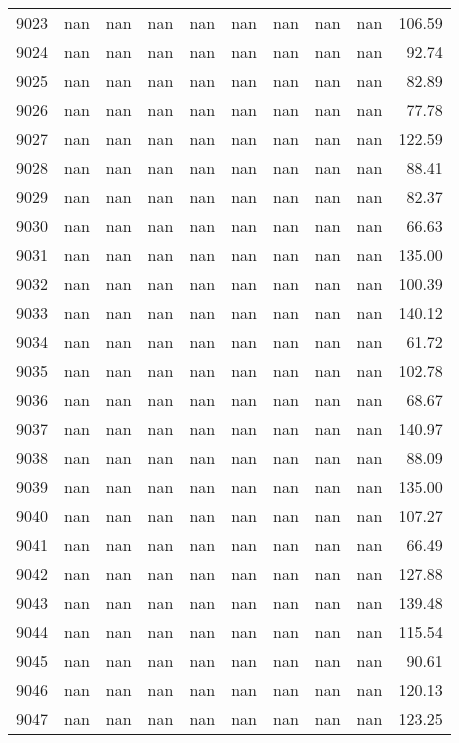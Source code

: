 \begin{tabular}{lrrrrrrrrr}
9023 & nan & nan & nan & nan & nan & nan & nan & nan & 106.59 \\
9024 & nan & nan & nan & nan & nan & nan & nan & nan & 92.74 \\
9025 & nan & nan & nan & nan & nan & nan & nan & nan & 82.89 \\
9026 & nan & nan & nan & nan & nan & nan & nan & nan & 77.78 \\
9027 & nan & nan & nan & nan & nan & nan & nan & nan & 122.59 \\
9028 & nan & nan & nan & nan & nan & nan & nan & nan & 88.41 \\
9029 & nan & nan & nan & nan & nan & nan & nan & nan & 82.37 \\
9030 & nan & nan & nan & nan & nan & nan & nan & nan & 66.63 \\
9031 & nan & nan & nan & nan & nan & nan & nan & nan & 135.00 \\
9032 & nan & nan & nan & nan & nan & nan & nan & nan & 100.39 \\
9033 & nan & nan & nan & nan & nan & nan & nan & nan & 140.12 \\
9034 & nan & nan & nan & nan & nan & nan & nan & nan & 61.72 \\
9035 & nan & nan & nan & nan & nan & nan & nan & nan & 102.78 \\
9036 & nan & nan & nan & nan & nan & nan & nan & nan & 68.67 \\
9037 & nan & nan & nan & nan & nan & nan & nan & nan & 140.97 \\
9038 & nan & nan & nan & nan & nan & nan & nan & nan & 88.09 \\
9039 & nan & nan & nan & nan & nan & nan & nan & nan & 135.00 \\
9040 & nan & nan & nan & nan & nan & nan & nan & nan & 107.27 \\
9041 & nan & nan & nan & nan & nan & nan & nan & nan & 66.49 \\
9042 & nan & nan & nan & nan & nan & nan & nan & nan & 127.88 \\
9043 & nan & nan & nan & nan & nan & nan & nan & nan & 139.48 \\
9044 & nan & nan & nan & nan & nan & nan & nan & nan & 115.54 \\
9045 & nan & nan & nan & nan & nan & nan & nan & nan & 90.61 \\
9046 & nan & nan & nan & nan & nan & nan & nan & nan & 120.13 \\
9047 & nan & nan & nan & nan & nan & nan & nan & nan & 123.25 \\

\end{tabular}
